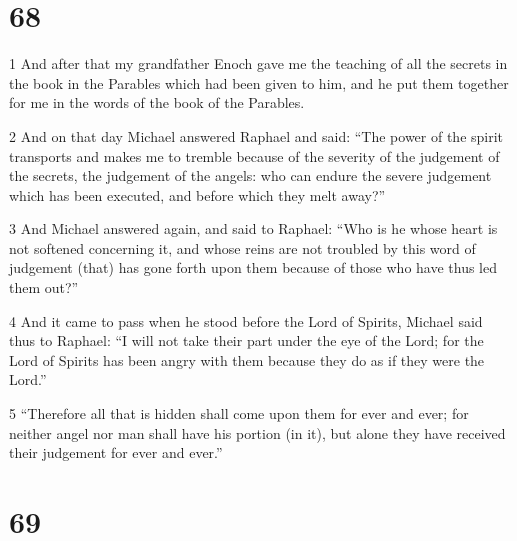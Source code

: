 \chapter{68}

\par 1 And after that my grandfather Enoch gave me the teaching of all the secrets in the book in the Parables which had been given to him, and he put them together for me in the words of the book of the Parables.
\par 2 And on that day Michael answered Raphael and said: “The power of the spirit transports and makes me to tremble because of the severity of the judgement of the secrets, the judgement of the angels: who can endure the severe judgement which has been executed, and before which they melt away?”
\par 3 And Michael answered again, and said to Raphael: “Who is he whose heart is not softened concerning it, and whose reins are not troubled by this word of judgement (that) has gone forth upon them because of those who have thus led them out?”
\par 4 And it came to pass when he stood before the Lord of Spirits, Michael said thus to Raphael: “I will not take their part under the eye of the Lord; for the Lord of Spirits has been angry with them because they do as if they were the Lord.”
\par 5 “Therefore all that is hidden shall come upon them for ever and ever; for neither angel nor man shall have his portion (in it), but alone they have received their judgement for ever and ever.”

\chapter{69}

